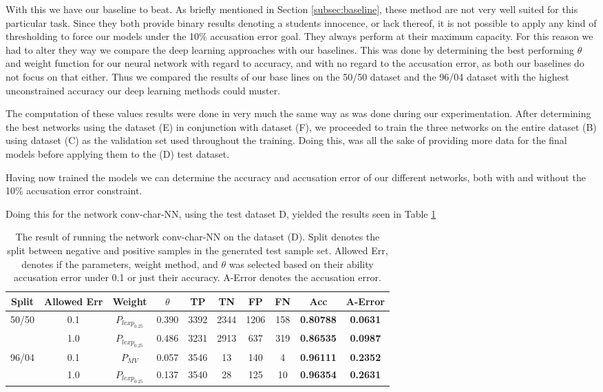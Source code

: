 With this we have our baseline to beat. As briefly mentioned in Section
\ref{subsec:baseline}, these method are not very well suited for this particular
task. Since they both provide binary results denoting a students innocence, or
lack thereof, it is not possible to apply any kind of thresholding to force
our models under the 10\% accusation error goal. They always perform at their
maximum capacity. For this reason we had to alter they way we compare the deep
learning approaches with our baselines. This was done by determining the best
performing $\theta$ and weight function for our neural network with regard to
accuracy, and with no regard to the accusation error, as both our baselines do
not focus on that either. Thus we compared the results of our base lines on the
50/50 dataset and the 96/04 dataset with the highest unconstrained accuracy our
deep learning methods could muster.

The computation of these values results were done in very much the same way as
was done during our experimentation. After determining the best networks using
the dataset (E) in conjunction with dataset (F), we proceeded to train the three
networks on the entire dataset (B) using dataset (C) as the validation set used
throughout the training. Doing this, was all the sake of providing more
data for the final models before applying them to the (D) test dataset.

Having now trained the models we can determine the accuracy and accusation
error of our different networks, both with and without the 10\% accusation error
constraint.

Doing this for the network \gls{conv-char-NN}, using the test dataset D, yielded
the results seen in Table \ref{tab:char_CNN_res}

\begin{table}[]
\begin{tabular}{|c|c|c|c|c|c|c|c||c|c|}
\hline
Split & Allowed Err & Weight & $\theta$ & TP & TN & FP & FN & \textbf{Acc} & \textbf{A-Error} \\ \hline
\multirow{2}{*}{50/50} & 0.1 & $P_{lexp_{0.25}}$ & 0.390 & 3392 & 2344 & 1206 & 158 & \textbf{0.80788} & \textbf{0.0631} \\ \cline{2-10} 
 & 1.0 & $P_{lexp_{0.25}}$ & 0.486 & 3231 & 2913 & 637 & 319 & \textbf{0.86535} & \textbf{0.0987} \\ \hline
\multirow{2}{*}{96/04} & 0.1 & $P_{MV}$ & 0.057 & 3546 & 13 & 140 & 4 & \textbf{0.96111} & \textbf{0.2352} \\ \cline{2-10} 
 & 1.0 & $P_{lexp_{0.25}}$ & 0.137 & 3540 & 28 & 125 & 10 & \textbf{0.96354} & \textbf{0.2631} \\ \hline
\end{tabular}
\caption{The result of running the network \gls{conv-char-NN} on the dataset
(D). Split denotes the split between negative and positive samples in the
generated test sample set. Allowed Err, denotes if the parameters, weight
method, and $\theta$ was selected based on their ability accusation error under
0.1 or just their accuracy. A-Error denotes the accusation error.}
\label{tab:char_CNN_res}
\end{table}

